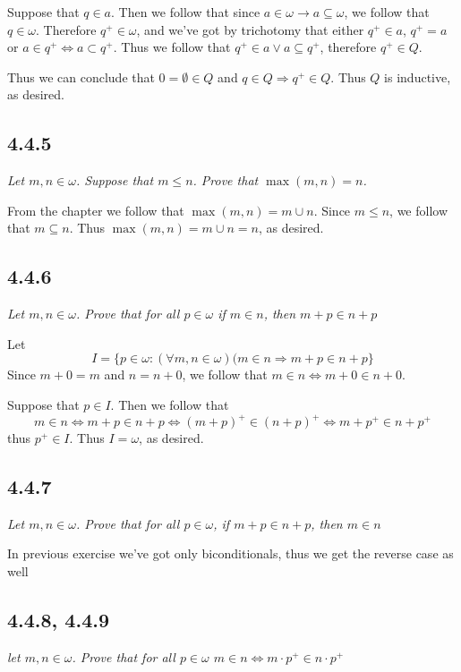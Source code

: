 \documentclass[11pt,oneside,titlepage]{book}
\DeclareMathOperator \lra {\Leftrightarrow}
\DeclareMathOperator \ra {\Rightarrow}
\begin{document}
Suppose that $q \in a$. Then we follow that since $a \in \omega \to a \subseteq \omega$,
we follow that $q \in \omega$. Therefore $q^+ \in \omega$, and
we've got by trichotomy that either $q^+ \in a$, $q^+ = a$ or $a \in q^+ \lra a \subset q^+$.
Thus we follow that $q^+ \in a \lor a \subseteq q^+$, therefore $q^+ \in Q$.

Thus we can conclude that $0 = \emptyset \in Q$ and $q \in Q \ra q^+ \in Q$. Thus $Q$ is
inductive, as desired.


\subsection*{4.4.5}

\textit{Let $m, n \in \omega$. Suppose that $m \leq n$. Prove that $\max(m, n) = n$.}

From the chapter we follow that $\max(m, n) = m \cup n$. Since $m \leq n$, we follow that
$m \subseteq n$. Thus $\max(m, n) = m \cup n = n$, as desired.

\subsection*{4.4.6}

\textit{Let $m, n \in \omega$. Prove that for all $p \in \omega$ if $m \in n$, then
  $m + p \in n + p$}

Let
$$I = \{p \in \omega: (\forall m, n \in \omega)(m \in n \ra m + p \in n + p\}$$
Since $m + 0 = m$ and $n = n + 0$, we follow that $m \in n \lra m + 0 \in n + 0$.

Suppose that $p \in I$. Then we follow that
$$m \in n \lra m + p \in n + p \lra (m + p)^+ \in (n + p)^+ \lra m + p^+ \in n + p^+$$
thus $p^+ \in I$. Thus $I = \omega$, as desired.

\subsection*{4.4.7}

\textit{Let $m, n \in \omega$. Prove that for all $p \in \omega$, if $m + p \in n + p$, then
  $m \in n$}

In previous exercise we've got only biconditionals, thus we get the reverse case as well

\subsection*{4.4.8, 4.4.9}

\textit{let $m, n \in \omega$. Prove that for all $p \in \omega$ $m \in n \lra
  m \cdot p^+ \in n \cdot p^+$}
\end{document}
